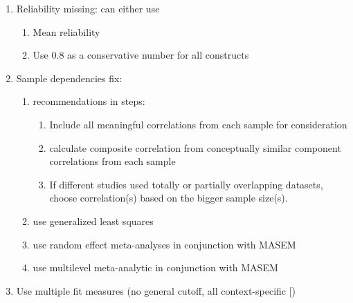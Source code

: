 \documentclass[
]{book}
\begin{document}
\begin{enumerate}
  \begin{enumerate}
  \def\labelenumii{\arabic{enumii}.}
  \item
    Choose alternative global starting values. \citep{eby1999motivational}
  \item
    Select precise starting values for parameter estimates \citep{eby1999motivational}
  \item
    Reduce the set of variables
  \end{enumerate}
\item
  Reliability missing: can either use

  \begin{enumerate}
  \def\labelenumii{\arabic{enumii}.}
  \item
    Mean reliability \citep{kirca2005market, rosengren2020meta}
  \item
    Use 0.8 as a conservative number for all constructs \citep{bergh2016using, aguinis2011debunking}
  \end{enumerate}
\item
  Sample dependencies fix:

  \begin{enumerate}
  \def\labelenumii{\arabic{enumii}.}
  \item
    \citep{geyskens2006make} recommendations in steps:

    \begin{enumerate}
    \def\labelenumiii{\arabic{enumiii}.}
    \item
      Include all meaningful correlations from each sample for consideration
    \item
      calculate composite correlation from conceptually similar component correlations from each sample
    \item
      If different studies used totally or partially overlapping datasets, choose correlation(s) based on the bigger sample size(s).
    \end{enumerate}
  \item
    use generalized least squares \citep{furlow2005meta, shadish1996}
  \item
    use random effect meta-analyses in conjunction with MASEM \citep{erez1996using}
  \item
    use multilevel meta-analytic in conjunction with MASEM \citep{van2003combining}
  \end{enumerate}
\item
  Use multiple fit measures (no general cutoff, all context-specific {[}\citet{nye2011effect})


\end{enumerate}
\end{document}
